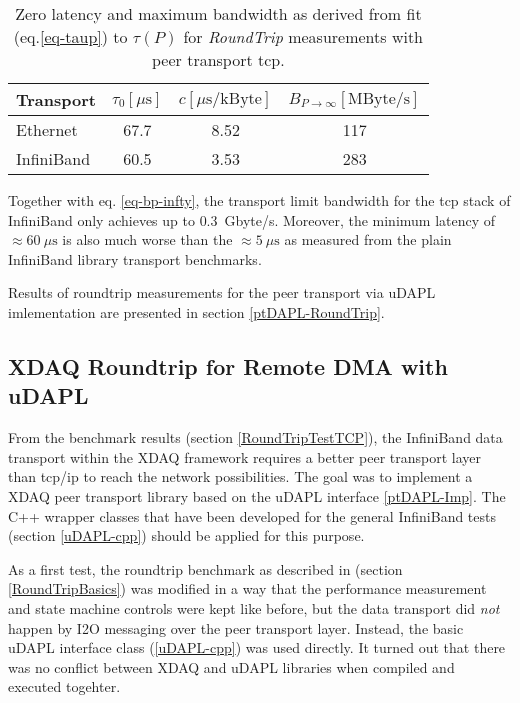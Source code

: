 \begin{table}[htb]
\begin{center}

\begin{tabular}{|l|c|c|c|}\hline



Transport  & $\tau_{0} [\mu\mbox{s}]$ & $c [\mu\mbox{s}/\mbox{kByte}]$ & $B_{P\to\infty} [\mbox{MByte/s}]$ \\ \hline\hline

Ethernet & 67.7 & 8.52 & 117 \\ \hline
InfiniBand & 60.5 & 3.53 & 283 \\ \hline

\end{tabular}
\caption{Zero latency and maximum bandwidth as derived from fit 
(eq.\ref{eq-taup}) to $\tau(P)$ for {\em RoundTrip} measurements with
peer transport tcp.
\label{tab-ether-ib-tcp}}
\end{center}

\end{table}
 
Together with eq. \ref{eq-bp-infty}, the transport limit bandwidth for
the tcp stack of InfiniBand only achieves up to $0.3$~\mbox{Gbyte/s}.
Moreover, the minimum latency of $\approx 60~\mu\mbox{s}$ is also much worse than
the $\approx 5~\mu\mbox{s}$ as measured from the plain InfiniBand library transport
benchmarks.

Results of roundtrip measurements for the peer transport via uDAPL
imlementation are presented in section \ref{ptDAPL-RoundTrip}.  



\subsection{XDAQ Roundtrip for Remote DMA with uDAPL}
\label{RDMA-XDAQ}
From the benchmark results (section \ref{RoundTripTestTCP}), 
the InfiniBand data transport within the XDAQ framework
requires a better peer transport layer than tcp/ip to reach
the network possibilities. The goal was to implement a XDAQ peer transport library
based on the uDAPL interface \ref{ptDAPL-Imp}. The C++ wrapper classes that
have been developed for the general InfiniBand tests
(section \ref{uDAPL-cpp}) should be applied for this purpose.


As a first test, the roundtrip benchmark as described in (section \ref{RoundTripBasics})
was modified in a way that the performance measurement and state machine 
controls were kept like before, but the data transport did {\em not} happen
by I2O messaging over the peer transport layer. Instead, the basic
uDAPL interface class (\ref{uDAPL-cpp}) was used directly.
It turned out that there was no conflict between XDAQ and uDAPL
libraries when compiled and executed togehter.





